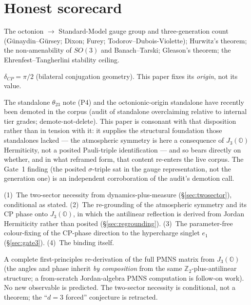 \documentclass[11pt]{article}
\theoremstyle{definition}
\newcommand{\OO}{\mathbb{O}}
\newcommand{\JthreeO}{J_3(\OO)}
\begin{document}
\section{Honest scorecard}\label{sec:scorecard}

\begin{description}[leftmargin=1.4em,style=nextline]
\item[Established prior art (not ours).] The octonion $\to$ Standard-Model gauge group and three-generation count (G\"unaydin--G\"ursey; Dixon; Furey; Todorov--Dubois-Violette); Hurwitz's theorem; the non-amenability of $SO(3)$ and Banach--Tarski; Gleason's theorem; the Ehrenfest--Tangherlini stability ceiling.
\item[Pre-existing in the corpus.] $\delta_{CP}=\pi/2$ (bilateral conjugation geometry). This paper fixes its \emph{origin}, not its value.
\item[Corpus status (2026-06-25).] The standalone $\theta_{23}$ note (P4) and the octonionic-origin standalone have recently been demoted in the corpus (audit of standalone overclaiming relative to internal tier grades; demote-not-delete). This paper is consonant with that disposition rather than in tension with it: it supplies the structural foundation those standalones lacked --- the atmospheric symmetry is here a consequence of $\JthreeO$ Hermiticity, not a posited Pauli-triple identification --- and so bears directly on whether, and in what reframed form, that content re-enters the live corpus. The Gate~1 finding (the posited $\sigma$-triple sat in the gauge representation, not the generation one) is an independent corroboration of the audit's demotion call.
\item[New here.] (1)~The two-sector necessity from dynamics-plus-measure (\S\ref{sec:twosector}), conditional as stated. (2)~The re-grounding of the atmospheric symmetry and its CP phase onto $\JthreeO$, in which the antilinear reflection is derived from Jordan Hermiticity rather than posited (\S\ref{sec:regrounding}). (3)~The parameter-free colour-fixing of the CP-phase direction to the hypercharge singlet $e_1$ (\S\ref{sec:gate3}). (4)~The binding itself.
\item[Not done; not claimed.] A complete first-principles re-derivation of the full PMNS matrix from $\JthreeO$ (the angles and phase inherit \emph{by composition} from the same $\mathbb{Z}_2$-plus-antilinear structure; a from-scratch Jordan-algebra PMNS computation is follow-on work). No new observable is predicted. The two-sector necessity is conditional, not a theorem; the ``$d=3$ forced'' conjecture is retracted.
\end{description}
\end{document}
